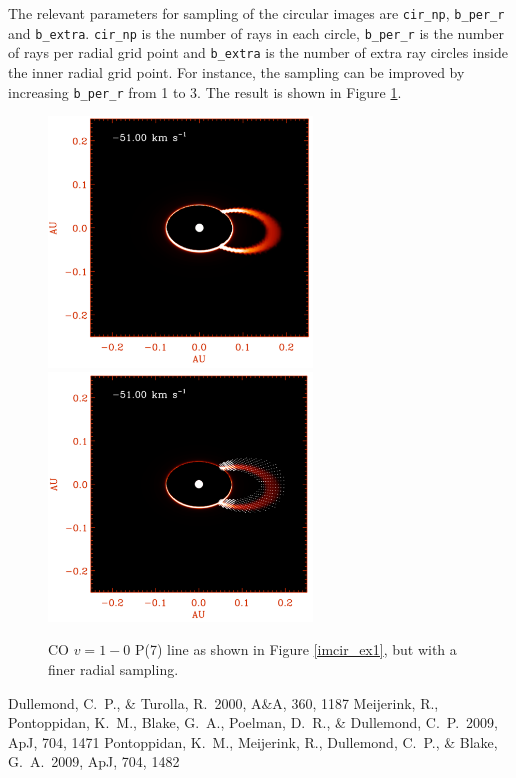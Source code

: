\documentclass[11pt]{article}
\def\apj{ApJ}
\def\aap{A\&A}
\begin{document}
The relevant parameters for sampling of the circular images are {\tt cir\_np}, {\tt b\_per\_r} and {\tt b\_extra}. {\tt cir\_np} is the number of rays in each circle, 
{\tt b\_per\_r} is the number of rays per radial grid point and {\tt b\_extra} is the number of extra ray circles inside the inner radial grid point. For instance, 
the sampling can be improved by increasing {\tt b\_per\_r} from 1 to 3. The result is shown in Figure \ref{imcir_ex3}. 

\begin{figure}
\centering
\includegraphics[width=7cm]{imcir_conv_ex3.pdf}
\includegraphics[width=7cm]{imcir_conv_ex4.pdf}
\caption{CO $v=1-0$ P(7) line as shown in Figure \ref{imcir_ex1}, but with a finer radial sampling.  }
\label{imcir_ex3}
\end{figure}

\begin{thebibliography}{}
\small
{} Dullemond, C.~P., \& Turolla, R.\ 2000, \aap, 360, 1187 
 Meijerink, R., 
Pontoppidan, K.~M., Blake, G.~A., Poelman, D.~R., 
\& Dullemond, C.~P.\ 2009, \apj, 704, 1471 
 Pontoppidan, K.~M., 
Meijerink, R., Dullemond, C.~P., \& Blake, G.~A.\ 2009, \apj, 704, 1482 



\end{thebibliography}
\end{document}
